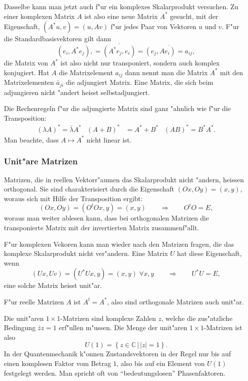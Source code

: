 Dasselbe kann man jetzt auch f"ur ein komplexes Skalarprodukt
versuchen. Zu einer komplexen Matrix $A$ ist also eine neue
Matrix $A^*$ gesucht, mit der Eigenschaft, $(A^*u,v)=(u,Av)$ f"ur 
jedes Paar von Vektoren $u$ und $v$. F"ur die Standardbasisvektoren
gilt dann
\[
(e_i,A^*e_j),
=
\overline{(A^*e_j, e_i)}
=
\overline{(e_j,Ae_i)=a_{ij}},
\]
die Matrix von $A^*$ ist also nicht nur transponiert, sondern auch komplex
konjugiert. Hat $A$ die Matrixelement $a_{ij}$ dann nennt man
die Matrix $A^*$ mit den Matrixelementen $\bar a_{ji}$ die
adjungiert Matrix. Eine Matrix, die sich beim adjungieren nicht
"andert heisst selbstadjungiert.

Die Rechenregeln f"ur die adjungierte Matrix sind ganz "ahnlich wie
f"ur die Transposition:
\begin{align*}
(\lambda A)^*=\bar\lambda A^*
&
(A+B)^*&=A^*+B^*
&
(AB)^*=B^*A^*.
\end{align*}
Man beachte, dass $A\mapsto A^*$ nicht linear ist.

\subsubsection{Unit"are Matrizen}
Matrizen, die in reellen Vektorr"aumen das Skalarprodukt nicht "andern,
heissen orthogonal. Sie sind charakterisiert durch die Eigenschaft
$(Ox,Oy)=(x,y)$, woraus sich mit Hilfe der Transposition ergibt:
\[
(Ox,Oy)=(O^tOx,y)=(x,y)\qquad\Rightarrow\qquad O^tO=E,
\]
woraus man weiter ablesen kann, dass bei orthogonalen Matrizen
die transponierte Matrix mit der invertierten Matrix zusammenf"allt.

F"ur komplexen Vekoren kann man wieder nach den Matrizen fragen, die das
komplexe Skalarprodukt nicht ver"andern. Eine Matrix $U$ hat diese
Eigenschaft, wenn
\[
(Ux,Uv)=(U^*Ux,y)=(x,y)\;\forall x,y
\qquad\Rightarrow\qquad
U^*U=E,
\]
eine solche Matrix heisst unit"ar. 

F"ur reelle Matrizen $A$ ist $A^t=A^*$, also sind orthogonale Matrizen
auch unit"ar.

\begin{beispiel}
Die unit"aren $1\times 1$-Matrizen sind komplexe Zahlen $z$, welche
die zus"atzliche Bedingung $\bar zz=1$ erf"ullen m"ussen.
Die Menge der unit"aren $1\times 1$-Matrizen ist also
\[
U(1)=\left\{ z\in\mathbb C\,|\, |z|=1
\right\}.
\]
In der Quantenmechanik k"onnen Zustandsvektoren in der Regel nur bis auf
einen komplesen Faktor vom Betrag $1$, also bis auf ein Element
von $U(1)$ festgelegt werden.
Man spricht oft von ``bedeutungslosen'' Phasenfaktoren.
\end{beispiel}

